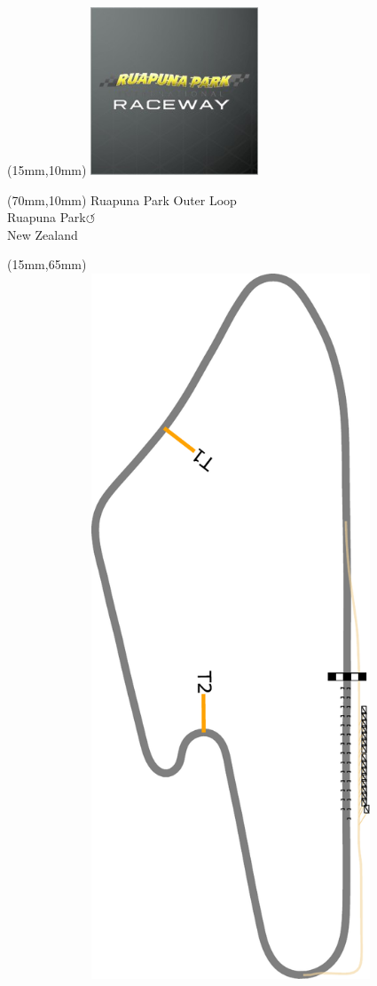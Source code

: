 \null\newpage
\begin{textblock*}{50mm}(15mm,10mm)%
\includegraphics[width=50mm]{LG/RUPU.png}
\end{textblock*}
\begin{textblock*}{130mm}(70mm,10mm)%
{\fontsize{20}{20}\selectfont Ruapuna Park Outer Loop\\}
{\fontsize{16}{16}\selectfont Ruapuna Park\hfill \Large$\circlearrowleft$\\}
{\fontsize{12}{12}\selectfont New Zealand\\}
\end{textblock*}
\begin{textblock*}{185mm}(15mm,65mm)%
\centering
\mbox{\includegraphics[width=185mm,height=210mm,keepaspectratio]{PT/RPOL.pdf}}
\end{textblock*}
